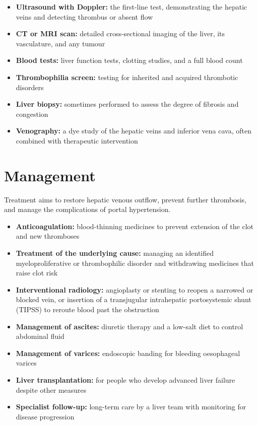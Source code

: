 \begin{itemize}
    \item \textbf{Ultrasound with Doppler:} the first-line test, demonstrating the hepatic veins and detecting thrombus or absent flow
    \item \textbf{CT or MRI scan:} detailed cross-sectional imaging of the liver, its vasculature, and any tumour
    \item \textbf{Blood tests:} liver function tests, clotting studies, and a full blood count
    \item \textbf{Thrombophilia screen:} testing for inherited and acquired thrombotic disorders
    \item \textbf{Liver biopsy:} sometimes performed to assess the degree of fibrosis and congestion
    \item \textbf{Venography:} a dye study of the hepatic veins and inferior vena cava, often combined with therapeutic intervention
\end{itemize}

\section*{Management}
Treatment aims to restore hepatic venous outflow, prevent further thrombosis, and manage the complications of portal hypertension.

\begin{itemize}
    \item \textbf{Anticoagulation:} blood-thinning medicines to prevent extension of the clot and new thromboses
    \item \textbf{Treatment of the underlying cause:} managing an identified myeloproliferative or thrombophilic disorder and withdrawing medicines that raise clot risk
    \item \textbf{Interventional radiology:} angioplasty or stenting to reopen a narrowed or blocked vein, or insertion of a transjugular intrahepatic portosystemic shunt (TIPSS) to reroute blood past the obstruction
    \item \textbf{Management of ascites:} diuretic therapy and a low-salt diet to control abdominal fluid
    \item \textbf{Management of varices:} endoscopic banding for bleeding oesophageal varices
    \item \textbf{Liver transplantation:} for people who develop advanced liver failure despite other measures
    \item \textbf{Specialist follow-up:} long-term care by a liver team with monitoring for disease progression
\end{itemize}

